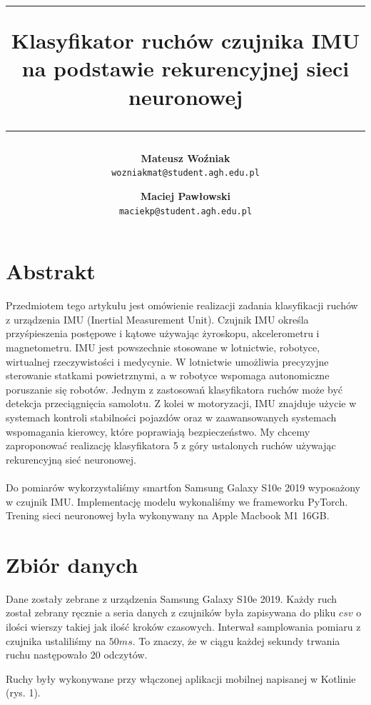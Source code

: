 \documentclass[10pt]{article}
\title{
\rule{\linewidth}{3pt}
Klasyfikator ruchów czujnika IMU na podstawie rekurencyjnej sieci neuronowej
\rule{\linewidth}{1pt}
}
\author{
  \textbf{Mateusz Woźniak}\\
  \texttt{wozniakmat@student.agh.edu.pl}
  \and
  \textbf{Maciej Pawłowski}\\
  \texttt{maciekp@student.agh.edu.pl}
}
\date{}
\begin{document}
\maketitle

\section{Abstrakt}

Przedmiotem tego artykułu jest omówienie realizacji zadania klasyfikacji ruchów z urządzenia IMU (Inertial Measurement Unit). Czujnik IMU określa przyśpieszenia postępowe i kątowe używając żyroskopu, akcelerometru i magnetometru. 
IMU jest powszechnie stosowane w lotnictwie, robotyce, wirtualnej rzeczywistości i medycynie. W lotnictwie umożliwia precyzyjne sterowanie statkami powietrznymi, a w robotyce wspomaga autonomiczne poruszanie się robotów. Jednym z zastosowań klasyfikatora ruchów może być detekcja przeciągnięcia samolotu. Z kolei w motoryzacji, IMU znajduje użycie w systemach kontroli stabilności pojazdów oraz w zaawansowanych systemach wspomagania kierowcy, które poprawiają bezpieczeństwo. My chcemy zaproponować realizację klasyfikatora 5 z góry ustalonych ruchów używając rekurencyjną sieć neuronowej. 
\\\\Do pomiarów wykorzystaliśmy smartfon Samsung Galaxy S10e 2019 wyposażony w czujnik IMU. Implementację modelu wykonaliśmy we frameworku PyTorch. Trening sieci neuronowej była wykonywany na Apple Macbook M1 16GB.

\section{Zbiór danych}
Dane zostały zebrane z urządzenia Samsung Galaxy S10e 2019. Każdy ruch został zebrany ręcznie a seria danych z czujników była zapisywana do pliku $csv$ o ilości wierszy takiej jak ilość kroków czasowych. Interwał samplowania pomiaru z czujnika ustaliliśmy na $50ms$. To znaczy, że w ciągu każdej sekundy trwania ruchu następowało 20 odczytów.

Ruchy były wykonywane przy włączonej aplikacji mobilnej napisanej w Kotlinie (rys. 1).
\end{document}
